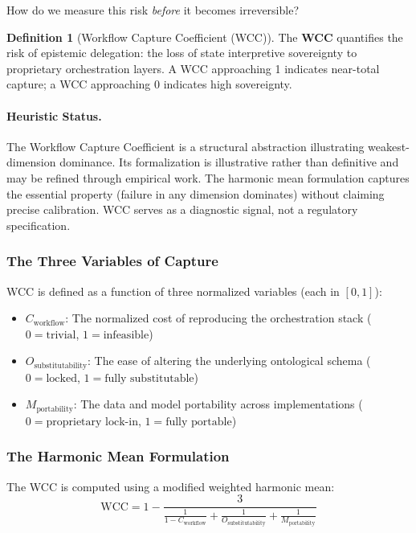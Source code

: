 \documentclass[11pt,a4paper]{article}
\theoremstyle{definition}
\newtheorem{definition}{Definition}[section]
\begin{document}
How do we measure this risk \textit{before} it becomes irreversible?

\begin{definition}[Workflow Capture Coefficient (WCC)]
\label{def:wcc}
The \textbf{WCC} quantifies the risk of epistemic delegation: the loss of state interpretive sovereignty to proprietary orchestration layers. A WCC approaching 1 indicates near-total capture; a WCC approaching 0 indicates high sovereignty.
\end{definition}

\paragraph{Heuristic Status.} The Workflow Capture Coefficient is a structural abstraction illustrating weakest-dimension dominance. Its formalization is illustrative rather than definitive and may be refined through empirical work. The harmonic mean formulation captures the essential property (failure in any dimension dominates) without claiming precise calibration. WCC serves as a diagnostic signal, not a regulatory specification.

\subsubsection{The Three Variables of Capture}

WCC is defined as a function of three normalized variables (each in $[0,1]$):

\begin{itemize}[noitemsep]
    \item $C_{\text{workflow}}$: The normalized cost of reproducing the orchestration stack ($0 = \text{trivial}$, $1 = \text{infeasible}$)
    \item $O_{\text{substitutability}}$: The ease of altering the underlying ontological schema ($0 = \text{locked}$, $1 = \text{fully substitutable}$)
    \item $M_{\text{portability}}$: The data and model portability across implementations ($0 = \text{proprietary lock-in}$, $1 = \text{fully portable}$)
\end{itemize}

\subsubsection{The Harmonic Mean Formulation}

The WCC is computed using a modified weighted harmonic mean:
\begin{equation}
\text{WCC} = 1 - \frac{3}{\frac{1}{1-C_{\text{workflow}}} + \frac{1}{O_{\text{substitutability}}} + \frac{1}{M_{\text{portability}}}}
\label{eq:wcc}
\end{equation}
\end{document}
